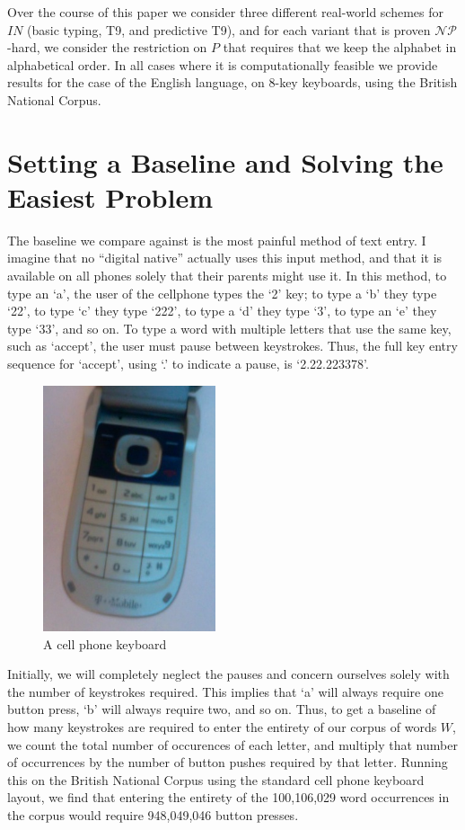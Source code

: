 \documentclass{article}
\newcommand{\NP}{\ensuremath{\mathcal{NP}}}
\begin{document}
Over the course of this paper we consider three different real-world
schemes for $IN$ (basic typing, T9, and predictive T9), and for each
variant that is proven \NP-hard, we consider the restriction on $P$ that
requires that we keep the alphabet in alphabetical order.  In all cases
where it is computationally feasible we provide results for the case of
the English language, on 8-key keyboards, using the British National
Corpus\cite{bnc}.  

\section{Setting a Baseline and Solving the Easiest Problem}

The baseline we compare against is the most painful method of text entry.  I
imagine that no ``digital native'' actually uses this input method, and that it
is available on all phones solely that their parents might use it.  In this
method, to type an `a', the user of the cellphone types the `2' key; to type a
`b' they type `22', to type `c' they type `222', to type a `d' they type `3',
to type an `e' they type `33', and so on.  To type a word with multiple
letters that use the same key, such as `accept', the user must pause
between keystrokes.  Thus, the full key entry sequence for `accept', using
`.' to indicate a pause, is `2.22.223378'.

\begin{figure}
\includegraphics[width=2in]{phonekeys.jpg}
\caption{A cell phone keyboard}
\label{keypic}
\end{figure}

Initially, we will completely neglect the pauses and concern ourselves solely
with the number of keystrokes required.  This implies that `a' will always
require one button press, `b' will always require two, and so on.  Thus, to get
a baseline of how many keystrokes are required to enter the entirety of our
corpus of words $W$, we count the total number of occurences of each letter,
and multiply that number of occurrences by the number of button pushes
required by that letter.  Running this on the British National Corpus
using the standard cell phone keyboard layout, we find that entering the
entirety of the 100,106,029 word occurrences in the corpus would require
948,049,046 button presses.  
\end{document}
